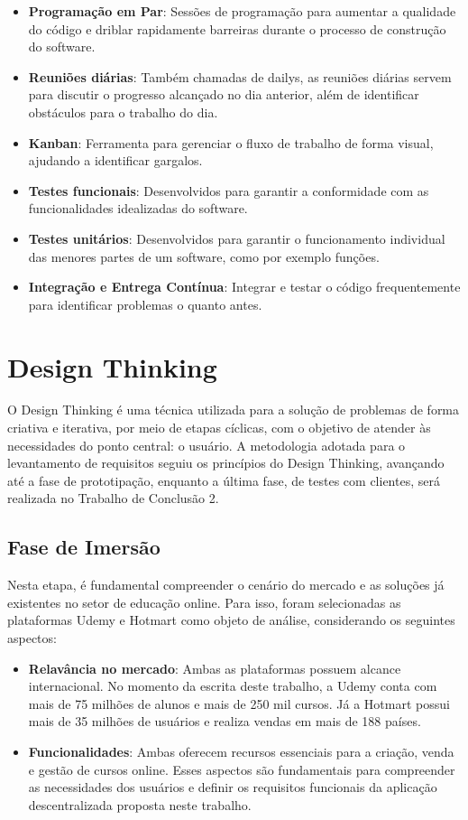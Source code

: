 \begin{itemize}
    \item \textbf{Programação em Par}: Sessões de programação para aumentar a qualidade do código e driblar rapidamente barreiras durante o processo de construção do software.
    \item \textbf{Reuniões diárias}: Também chamadas de dailys, as reuniões diárias servem para discutir o progresso alcançado no dia anterior, além de identificar obstáculos para o trabalho do dia.
    \item \textbf{Kanban}: Ferramenta para gerenciar o fluxo de trabalho de forma visual, ajudando a identificar gargalos.
    \item \textbf{Testes funcionais}: Desenvolvidos para garantir a conformidade com as funcionalidades idealizadas do software.
    \item \textbf{Testes unitários}: Desenvolvidos para garantir o funcionamento individual das menores partes de um software, como por exemplo funções.
    \item \textbf{Integração e Entrega Contínua}: Integrar e testar o código frequentemente para identificar problemas o quanto antes.
\end{itemize}

\section{Design Thinking}

O Design Thinking é uma técnica utilizada para a solução de problemas de forma criativa e iterativa, por meio de etapas cíclicas, com o objetivo de atender às necessidades do ponto central: o usuário. A metodologia adotada para o levantamento de requisitos seguiu os princípios do Design Thinking, avançando até a fase de prototipação, enquanto a última fase, de testes com clientes, será realizada no Trabalho de Conclusão 2.

    \subsection{Fase de Imersão}
    Nesta etapa, é fundamental compreender o cenário do mercado e as soluções já existentes no setor de educação online. Para isso, foram selecionadas as plataformas Udemy e Hotmart como objeto de análise, considerando os seguintes aspectos:

        \begin{itemize}
            \item \textbf{Relavância no mercado}: Ambas as plataformas possuem alcance internacional. No momento da escrita deste trabalho, a Udemy conta com mais de 75 milhões de alunos e mais de 250 mil cursos. Já a Hotmart possui mais de 35 milhões de usuários e realiza vendas em mais de 188 países.
            \item \textbf{Funcionalidades}: Ambas oferecem recursos essenciais para a criação, venda e gestão de cursos online. Esses aspectos são fundamentais para compreender as necessidades dos usuários e definir os requisitos funcionais da aplicação descentralizada proposta neste trabalho.
        \end{itemize}

